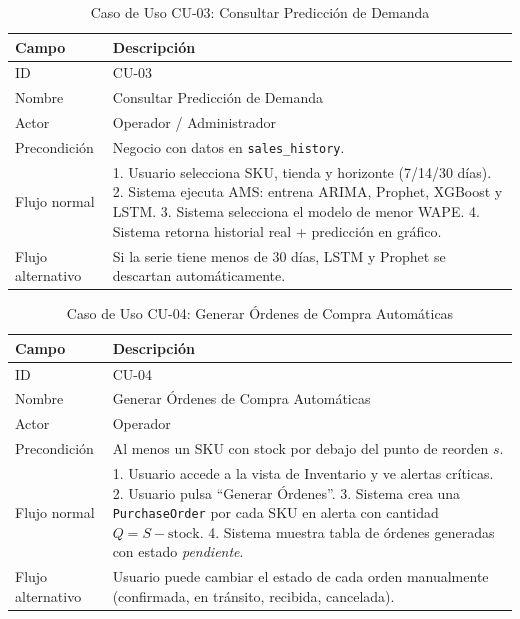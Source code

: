 \documentclass[12pt, a4paper]{report}
\begin{document}
\begin{table}[H]
  \centering
  \caption{Caso de Uso CU-03: Consultar Predicción de Demanda}
  \label{tab:cu03}
  \begin{tabular}{|l|p{9cm}|}
    \hline
    \textbf{Campo} & \textbf{Descripción} \\
    \hline
    ID            & CU-03 \\
    Nombre        & Consultar Predicción de Demanda \\
    Actor         & Operador / Administrador \\
    Precondición  & Negocio con datos en \texttt{sales\_history}. \\
    Flujo normal  & 1. Usuario selecciona SKU, tienda y horizonte (7/14/30 días).
                    2. Sistema ejecuta AMS: entrena ARIMA, Prophet, XGBoost y LSTM.
                    3. Sistema selecciona el modelo de menor WAPE. 4. Sistema retorna
                    historial real + predicción en gráfico. \\
    Flujo alternativo & Si la serie tiene menos de 30 días, LSTM y Prophet se
                        descartan automáticamente. \\
    \hline
  \end{tabular}
\end{table}

\begin{table}[H]
  \centering
  \caption{Caso de Uso CU-04: Generar Órdenes de Compra Automáticas}
  \label{tab:cu04}
  \begin{tabular}{|l|p{9cm}|}
    \hline
    \textbf{Campo} & \textbf{Descripción} \\
    \hline
    ID            & CU-04 \\
    Nombre        & Generar Órdenes de Compra Automáticas \\
    Actor         & Operador \\
    Precondición  & Al menos un SKU con stock por debajo del punto de reorden $s$. \\
    Flujo normal  & 1. Usuario accede a la vista de Inventario y ve alertas críticas.
                    2. Usuario pulsa ``Generar Órdenes''. 3. Sistema crea una
                    \texttt{PurchaseOrder} por cada SKU en alerta con cantidad $Q = S - \text{stock}$.
                    4. Sistema muestra tabla de órdenes generadas con estado \textit{pendiente}. \\
    Flujo alternativo & Usuario puede cambiar el estado de cada orden manualmente
                        (confirmada, en tránsito, recibida, cancelada). \\
    \hline
  \end{tabular}
\end{table}
\end{document}
